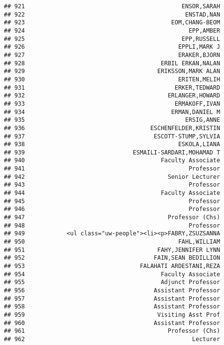 \documentclass[
]{article}
\begin{document}
\begin{verbatim}
## 921                                             ENSOR,SARAH
## 922                                              ENSTAD,NAN
## 923                                          EOM,CHANG-BEOM
## 924                                               EPP,AMBER
## 925                                             EPP,RUSSELL
## 926                                            EPPLI,MARK J
## 927                                            ERAKER,BJORN
## 928                                       ERBIL ERKAN,NALAN
## 929                                      ERIKSSON,MARK ALAN
## 930                                            ERITEN,MELIH
## 931                                           ERKER,TEDWARD
## 932                                         ERLANGER,HOWARD
## 933                                           ERMAKOFF,IVAN
## 934                                          ERMAN,DANIEL M
## 935                                              ERSIG,ANNE
## 936                                    ESCHENFELDER,KRISTIN
## 937                                     ESCOTT-STUMP,SYLVIA
## 938                                            ESKOLA,LIANA
## 939                               ESMAILI-SARDARI,MOHAMAD T
## 940                                       Faculty Associate
## 941                                               Professor
## 942                                         Senior Lecturer
## 943                                               Professor
## 944                                       Faculty Associate
## 945                                               Professor
## 946                                               Professor
## 947                                         Professor (Chs)
## 948                                               Professor
## 949            <ul class="uw-people"><li><p>FABRY,ZSUZSANNA
## 950                                            FAHL,WILLIAM
## 951                                      FAHY,JENNIFER LYNN
## 952                                     FAIN,SEAN BEDILLION
## 953                                 FALAHATI ARDESTANI,REZA
## 954                                       Faculty Associate
## 955                                       Adjunct Professor
## 956                                     Assistant Professor
## 957                                     Assistant Professor
## 958                                     Assistant Professor
## 959                                      Visiting Asst Prof
## 960                                     Assistant Professor
## 961                                         Professor (Chs)
## 962                                                Lecturer

\end{verbatim}
\end{document}
